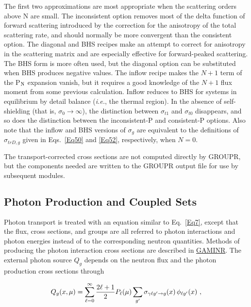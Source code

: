 \noindent
The first two approximations are most appropriate when the scattering orders
above N are small.  The inconsistent option removes most of the delta
function of forward scattering introduced by the correction for the
anisotropy of the total scattering rate, and should normally be more
convergent than the consistent option.  The diagonal and BHS recipes
make an attempt to correct for anisotropy in the scattering matrix and
are especially effective for forward-peaked scattering.  The BHS form
is more often used, but the diagonal option can be substituted when BHS
produces negative values.  The inflow recipe makes the $N{+}1$ term of
the P$_{\rm N}$ expansion vanish, but it requires a good knowledge of
the $N{+}1$ flux moment from some previous calculation.  Inflow reduces
to BHS for systems in equilibrium by detail balance ({\it i.e.}, the
thermal region).  In the absence of self-shielding (that is,
$\sigma_0{\rightarrow}\infty$), the distinction between $\sigma_{t1}$
and $\sigma_{t0}$ disappears, and so does the distinction between the
inconsistent-P and consistent-P options.  Also note that the inflow
and BHS versions of $\sigma_g$ are equivalent to the definitions of
$\sigma_{trD,g}$ given in Eqs.~\ref{Eq50} and \ref{Eq52}, respectively,
when $N{=}0$.

The transport-corrected cross sections are not computed directly
by GROUPR, but the components needed are written to the GROUPR output
file for use by subsequent modules.

\subsection{Photon Production and Coupled Sets}
\label{ssGROUPR_CoupledPhoton}

Photon transport
is treated with an equation similar to Eq.~\ref{Eq7},
except that the flux, cross sections, and groups are all referred to
photon interactions and photon energies instead of to the corresponding
neutron quantities.  Methods of producing the photon interaction cross
sections are described in
\hyperlink{sGAMINRhy}{GAMINR}.
  The
external photon source $Q_g$ depends on the neutron flux and the
photon production cross sections through

  \begin{equation}
    Q_g(x,\mu)=\sum_{\ell=0}^{\infty}{{2\ell+1}\over{2}}
    P_{\ell}(\mu)\sum_{g'}\sigma_{\gamma\ell g'\rightarrow g}(x)
    \,\phi_{\ell g'}(x)\,\,,
  \end{equation}
\vspace{1 pt}

